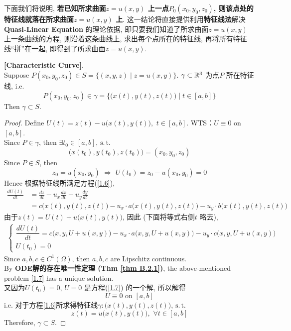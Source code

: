 	\vspace*{4em}
	
	下面我们将说明, \textbf{若已知所求曲面$z = u(x , y)$ 上一点$P_0(x_0 , y_0 , z_0)$, 则该点处的特征线就落在所求曲面$z = u(x , y)$ 上}. 这一结论将直接提供利用\textbf{特征线法}解决\textbf{Quasi-Linear Equation} 的理论依据, 即只要我们知道了所求曲面$z = u(x , y)$ 上一条曲线的方程, 则沿着这条曲线上, 求出每个点所在的特征线, 再将所有特征线“拼”在一起, 即得到了所求曲面$z = u(x , y)$. 
	
	\newpage
	
	\begin{thm}\label{thm 1.2.1}
		\textbf{[Characteristic Curve]}. \\
		Suppose $P(x_0 , y_0 , z_0) \in S = \Big\{ (x ,  y , z) \mid z = u(x , y) \Big\}$. $\gamma \subset \mathbb{R}^3$ 为点$P$ 所在特征线, i.e.
		\[ P (x_0 , y_0 , z_0) \in \gamma = \Big\{ \Big( x(t) , y(t) , z(t) \Big) \mid t \in [a , b] \Big\} \]
		Then $\gamma \subset S$. 
		
		\vspace*{6em}
		
		\begin{proof}
			Define $U(t) = z(t) - u\Big( x(t) , y(t) \Big) , \,\, t \in [a , b]$. WTS：$U \equiv 0$ on $[a , b]$. \\
			Since $P \in \gamma$, then $\exists t_0 \in [a , b]$, $\operatorname{s.t.}$
			\[ \Big( x(t_0) , y(t_0) , z(t_0) \Big) = (x_0 , y_0 , z_0) \]
			Since $P \in S$, then
			\[ z_0 = u(x_0 , y_0) \,\, \Rightarrow \,\, U(t_0) = z_0 - u(x_0 , y_0) = 0 \]
			Hence 根据特征线所满足方程(\ref{1.6}), 
			\begin{align*}
				\frac{dU(t)}{dt} 
				&= \frac{dz}{dt} - u_x \frac{dx}{dt} - u_y \frac{dy}{dt} \\
				&= c \Big( x(t) , y(t) , z(t) \Big) - u_x \cdot a \Big( x(t) , y(t) , z(t) \Big) - u_y \cdot b \Big( x(t) , y(t) , z(t) \Big) 
			\end{align*}
			由于$z(t) = U(t) + u\Big( x(t) , y(t) \Big)$, 因此 (下面将等式右侧$t$ 略去), 
			\begin{align}
				\begin{cases}
					\dfrac{dU(t)}{dt} 
					= c \Big( x , y , U + u(x , y) \Big) - u_x \cdot a \Big( x , y , U + u(x , y) \Big) - u_y \cdot c \Big( x , y , U + u(x , y) \Big) \\
					U(t_0) = 0
				\end{cases}\label{1.7}
			\end{align}
			Since $a , b , c \in C^1(\Omega)$, then $a , b , c$ are Lipschitz continuous. \\
			By \textbf{ODE解的存在唯一性定理 (Thm \ref{thm B.2.1})}, the above-mentioned problem \ref{1.7} has a unique solution. \\
			又因为$U(t_0) = 0$, $U = 0$ 是方程(\ref{1.7}) 的一个解, 所以解得
			\[ U \equiv 0 \,\, \text{on} \,\, [a , b] \]
			i.e. 对于方程\ref{1.6}所求得特征线$\gamma : \Big( x(t) , y(t) , z(t) \Big)$, $\operatorname{s.t.}$
			\[ z(t) = u\Big( x(t) , y(t) \Big) , \,\, \forall t \in [a , b] \]
			Therefore, $\gamma \subset S$. 
		\end{proof}
	\end{thm}

